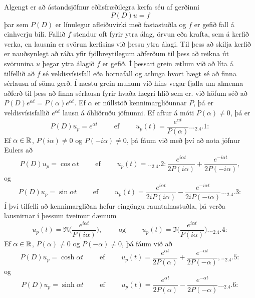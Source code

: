 \noindent
Algengt er að ástandsjöfnur eðlisfræðilegra kerfa séu af gerðinni
 $$P(D)u=f
 $$
þar sem $P(D)$ er línulegur afleiðuvirki með fastastuðla og $f$ er gefið
fall á einhverju bili.  Fallið $f$ stendur oft fyrir ytra álag, örvun
eða krafta, sem á kerfið verka, en lausnin er svörun kerfisins við
þessu ytra álagi.   Til þess að skilja kerfið er nauðsynlegt að ráða
yfir fjölbreytilegum aðferðum til þess að reikna út svörunina $u$
þegar ytra álagið $f$ er gefið.  Í þessari grein ætlum við að líta á
tilfellið að $f$ sé veldisvísisfall eða hornafall og athuga hvort hægt
sé að finna sérlausn af sömu gerð.  Í næstu grein munum við hins vegar
fjalla um almenna aðferð til þess að finna sérlausn fyrir hvaða hægri
hlið sem er.
við höfum séð að $P(D)e^{\alpha t}=P(\alpha)e^{\alpha t}$.  Ef
$\alpha$ er núllstöð
kennimargliðunnar $P$, þá er veldisvísisfallið $e^{\alpha t}$ lausn á
óhliðruðu jöfnunni.  Ef aftur á móti $P(\alpha) \neq 0$, þá er
\begin{equation*}
P(D)u_p=e^{\alpha t} \qquad\text{ ef } \qquad 
u_p(t)=\dfrac{e^{\alpha t}}{P(\alpha)}.

.. _2.4.1:

\end{equation*}
Ef $\alpha\in {\mathbb R}$, $P(i\alpha)\neq 0$ og $P(-i\alpha)\neq 0$, þá fáum
við með því að nota jöfnur Eulers að
\begin{equation*}
P(D)u_p=\cos \alpha t \qquad\text{ ef } \qquad 
u_p(t)=

.. _2.4.2:

\dfrac{e^{i\alpha t}}{2P(i\alpha)}+
\dfrac{e^{-i\alpha t}}{2P(-i\alpha)},
\end{equation*}
og
\begin{equation*}
P(D)u_p=\sin \alpha t \qquad\text{ ef } \qquad 
u_p(t)=\dfrac{e^{i\alpha t}}{2iP(i\alpha)}
-\dfrac{e^{-i\alpha t}}{2iP(-i\alpha)}.

.. _2.4.3:

\end{equation*}
Í því tilfelli að kennimargliðan hefur eingöngu rauntalnastuðla, þá
verða lausnirnar í þessum tveimur dæmum
\begin{equation*}
u_p(t)=\Re \bigg(\dfrac{e^{i{\alpha}t}}{P(i{\alpha})}\bigg), \qquad
\text{ og } \qquad
u_p(t)=\Im \bigg(\dfrac{e^{i{\alpha}t}}{P(i{\alpha})}\bigg).

.. _2.4.4:

\end{equation*}
Ef $\alpha\in {\mathbb R}$, $P(\alpha)\neq 0$ og $P(-\alpha)\neq 0$, þá fáum
við að 
\begin{equation*}
P(D)u_p=\cosh \alpha t \qquad\text{ ef }\qquad
u_p(t)=\dfrac{e^{\alpha t}}{2P(\alpha)}+\dfrac{e^{-\alpha
t}}{2P(-\alpha)},

.. _2.4.5:

\end{equation*}
og
\begin{equation*}
P(D)u_p=\sinh \alpha t \qquad\text{ ef }\qquad
u_p(t)=\dfrac{e^{\alpha t}}{2P(\alpha)}-\dfrac{e^{-\alpha
t}}{2P(-\alpha)}.

.. _2.4.6:

\end{equation*}


